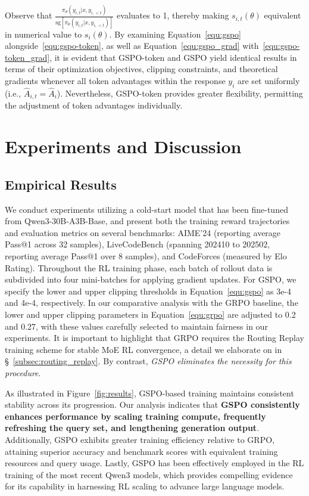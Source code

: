 Observe that $\frac{ \pi_{\theta} (y_{i,t} | x, y_{i,<t}) }{ \mathrm{sg} \left[ \pi_{\theta} (y_{i,t} | x, y_{i,<t}) \right] }$ evaluates to 1, thereby making $s_{i,t}(\theta)$ equivalent in numerical value to $s_{i}(\theta)$. By examining Equation~\eqref{equ:gspo} alongside~\eqref{equ:gspo-token}, as well as Equation~\eqref{equ:gspo_grad} with~\eqref{equ:gspo-token_grad}, it is evident that GSPO-token and GSPO yield identical results in terms of their optimization objectives, clipping constraints, and theoretical gradients whenever all token advantages within the response $y_i$ are set uniformly (i.e., $\widehat{A}_{i,t} = \widehat{A}_{i}$). Nevertheless, GSPO-token provides greater flexibility, permitting the adjustment of token advantages individually.

\section{Experiments and Discussion}

\subsection{Empirical Results}

We conduct experiments utilizing a cold-start model that has been fine-tuned from Qwen3-30B-A3B-Base, and present both the training reward trajectories and evaluation metrics on several benchmarks: AIME'24 (reporting average Pass@1 across 32 samples), LiveCodeBench (spanning 202410 to 202502, reporting average Pass@1 over 8 samples), and CodeForces (measured by Elo Rating). Throughout the RL training phase, each batch of rollout data is subdivided into four mini-batches for applying gradient updates. For GSPO, we specify the lower and upper clipping thresholds in Equation~\eqref{equ:gspo} as 3e-4 and 4e-4, respectively. In our comparative analysis with the GRPO baseline, the lower and upper clipping parameters in Equation~\eqref{equ:grpo} are adjusted to 0.2 and 0.27, with these values carefully selected to maintain fairness in our experiments. It is important to highlight that GRPO requires the Routing Replay training scheme for stable MoE RL convergence, a detail we elaborate on in \S~\ref{subsec:routing_replay}. By contrast, \textit{GSPO eliminates the necessity for this procedure}.

As illustrated in Figure~\ref{fig:results}, GSPO-based training maintains consistent stability across its progression. Our analysis indicates that \textbf{GSPO consistently enhances performance by scaling training compute, frequently refreshing the query set, and lengthening generation output}. Additionally, GSPO exhibits greater training efficiency relative to GRPO, attaining superior accuracy and benchmark scores with equivalent training resources and query usage. Lastly, GSPO has been effectively employed in the RL training of the most recent Qwen3 models, which provides compelling evidence for its capability in harnessing RL scaling to advance large language models.

